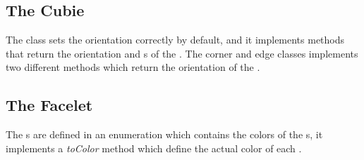 \subsection{The Cubie}
The \cpiece{} class sets the orientation correctly by default, and it implements methods that return the orientation and \facelet{}s of the \cpiece{}. The corner and edge \cpiece{} classes implements two different methods which return the orientation of the \cpiece{}.

\subsection{The Facelet}
The \facelet{}s are defined in an enumeration which contains the colors of the \facelet{}s, it implements a \textit{toColor} method which define the actual color of each \facelet{}.